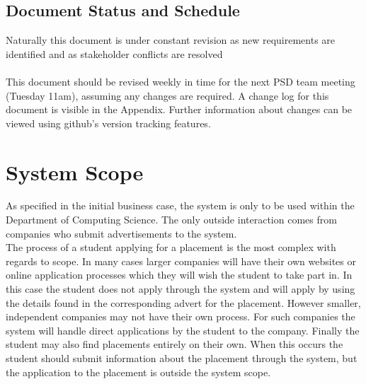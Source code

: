 \documentclass{l3deliverable}
\begin{document}
\subsection{Document Status and Schedule}
Naturally this document is under constant revision as new requirements are identified and as stakeholder conflicts are resolved\\
\\
This document should be revised weekly in time for the next PSD team meeting (Tuesday 11am), assuming any changes are required. A change log for this document is visible in the Appendix. Further information about changes can be viewed using github's version tracking features.


\newpage
\section{System Scope}
As specified in the initial business case, the system is only to be used within the Department of Computing Science. The only outside interaction comes from companies who submit advertisements to the system. \\
The process of a student applying for a placement is the most complex with regards to scope. In many cases larger companies will have their own websites or online application processes which they will wish the student to take part in. In this case the student does not apply through the system and will apply by using the details found in the corresponding advert for the placement. However smaller, independent companies may not have their own process. For such companies the system will handle direct applications by the student to the company. Finally the student may also find placements entirely on their own. When this occurs the student should submit information about the placement through the system, but the application to the placement is outside the system scope.\\

\end{document}
